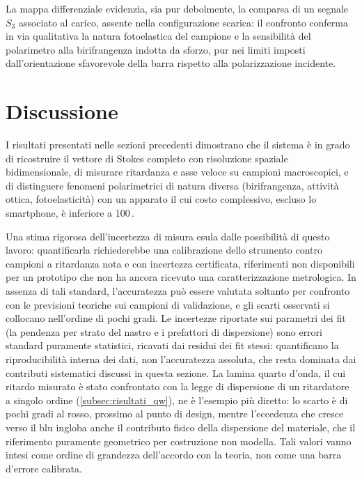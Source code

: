 La mappa differenziale evidenzia, sia pur debolmente, la comparsa di un segnale $S_3$ associato al carico, assente nella configurazione scarica: il confronto conferma in via qualitativa la natura fotoelastica del campione e la sensibilità del polarimetro alla birifrangenza indotta da sforzo, pur nei limiti imposti dall'orientazione sfavorevole della barra rispetto alla polarizzazione incidente.

\section{Discussione}
\label{sec:discussione}

I risultati presentati nelle sezioni precedenti dimostrano che il sistema è in grado di ricostruire il vettore di Stokes completo con risoluzione spaziale bidimensionale, di misurare ritardanza e asse veloce su campioni macroscopici, e di distinguere fenomeni polarimetrici di natura diversa (birifrangenza, attività ottica, fotoelasticità) con un apparato il cui costo complessivo, escluso lo smartphone, è inferiore a 100\,\texteuro.

Una stima rigorosa dell'incertezza di misura esula dalle possibilità di questo lavoro: quantificarla richiederebbe una calibrazione dello strumento contro campioni a ritardanza nota e con incertezza certificata, riferimenti non disponibili per un prototipo che non ha ancora ricevuto una caratterizzazione metrologica. In assenza di tali standard, l'accuratezza può essere valutata soltanto per confronto con le previsioni teoriche sui campioni di validazione, e gli scarti osservati si collocano nell'ordine di pochi gradi. Le incertezze riportate sui parametri dei fit (la pendenza per strato del nastro e i prefattori di dispersione) sono errori standard puramente statistici, ricavati dai residui dei fit stessi: quantificano la riproducibilità interna dei dati, non l'accuratezza assoluta, che resta dominata dai contributi sistematici discussi in questa sezione. La lamina quarto d'onda, il cui ritardo misurato è stato confrontato con la legge di dispersione di un ritardatore a singolo ordine (\cref{subsec:risultati_qw}), ne è l'esempio più diretto: lo scarto è di pochi gradi al rosso, prossimo al punto di design, mentre l'eccedenza che cresce verso il blu ingloba anche il contributo fisico della dispersione del materiale, che il riferimento puramente geometrico per costruzione non modella. Tali valori vanno intesi come ordine di grandezza dell'accordo con la teoria, non come una barra d'errore calibrata.

